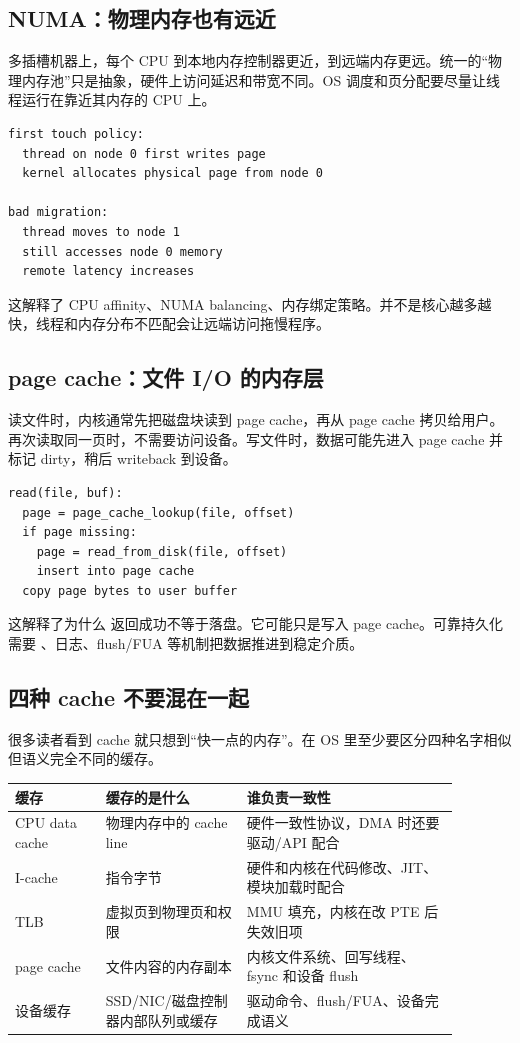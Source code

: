 \subsection{NUMA：物理内存也有远近}

多插槽机器上，每个 CPU 到本地内存控制器更近，到远端内存更远。统一的“物理内存池”只是抽象，硬件上访问延迟和带宽不同。OS 调度和页分配要尽量让线程运行在靠近其内存的 CPU 上。

\begin{lstlisting}
first touch policy:
  thread on node 0 first writes page
  kernel allocates physical page from node 0

bad migration:
  thread moves to node 1
  still accesses node 0 memory
  remote latency increases
\end{lstlisting}

这解释了 CPU affinity、NUMA balancing、内存绑定策略。并不是核心越多越快，线程和内存分布不匹配会让远端访问拖慢程序。

\subsection{page cache：文件 I/O 的内存层}

读文件时，内核通常先把磁盘块读到 page cache，再从 page cache 拷贝给用户。再次读取同一页时，不需要访问设备。写文件时，数据可能先进入 page cache 并标记 dirty，稍后 writeback 到设备。

\begin{lstlisting}
read(file, buf):
  page = page_cache_lookup(file, offset)
  if page missing:
    page = read_from_disk(file, offset)
    insert into page cache
  copy page bytes to user buffer
\end{lstlisting}

这解释了为什么  返回成功不等于落盘。它可能只是写入 page cache。可靠持久化需要 、日志、flush/FUA 等机制把数据推进到稳定介质。

\subsection{四种 cache 不要混在一起}

很多读者看到 cache 就只想到“快一点的内存”。在 OS 里至少要区分四种名字相似但语义完全不同的缓存。

\begin{longtable}{p{0.18\linewidth}p{0.28\linewidth}p{0.42\linewidth}}
\toprule
缓存 & 缓存的是什么 & 谁负责一致性 \\
\midrule
CPU data cache & 物理内存中的 cache line & 硬件一致性协议，DMA 时还要驱动/API 配合 \\
I-cache & 指令字节 & 硬件和内核在代码修改、JIT、模块加载时配合 \\
TLB & 虚拟页到物理页和权限 & MMU 填充，内核在改 PTE 后失效旧项 \\
page cache & 文件内容的内存副本 & 内核文件系统、回写线程、fsync 和设备 flush \\
设备缓存 & SSD/NIC/磁盘控制器内部队列或缓存 & 驱动命令、flush/FUA、设备完成语义 \\
\bottomrule
\end{longtable}

